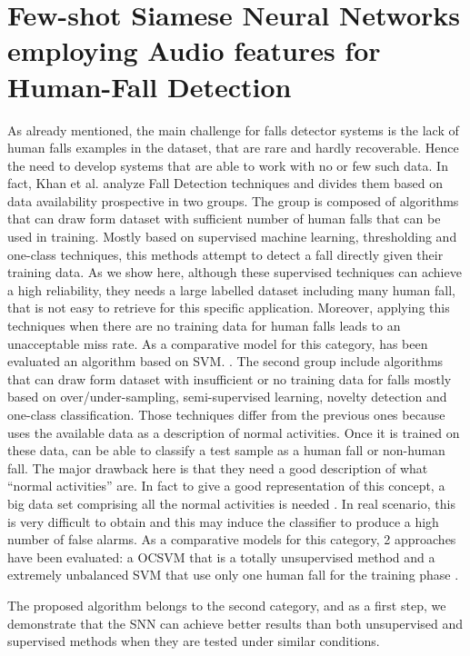 \section{Few-shot Siamese Neural Networks employing Audio features for Human-Fall Detection}
\label{sec:siamese_few_shot}
As already mentioned, the main challenge for falls detector systems is the lack of human falls examples in the dataset, that are rare and hardly recoverable. Hence the need to develop systems that are able to work with no or few such data. In fact, Khan et al. \cite{khan2017review} analyze Fall Detection techniques and divides them based on data availability prospective in two groups. The group is composed of algorithms that can draw form dataset with sufficient number of human falls that can be used in training. Mostly based on supervised machine learning, thresholding and one-class techniques, this methods attempt to detect a fall directly given their training data. As we show here, although these supervised techniques can achieve a high reliability, they needs a large labelled dataset including many human fall, that is not easy to retrieve for this specific application. Moreover, applying this techniques when there are no training data for human falls leads to an unacceptable miss rate. As a comparative model for this category, has been evaluated an algorithm based on SVM.%
. The second group include algorithms that can draw form dataset with insufficient or no training data for falls mostly based on over/under-sampling, semi-supervised learning, novelty detection and one-class classification. Those techniques differ from the previous ones because uses the available data as a description of normal activities. Once it is trained on these data, can be able to classify a test sample as a human fall or non-human fall. The major drawback here is that they need a good description of what ``normal activities'' are. In fact to give a good representation of this concept, a big data set comprising all the normal activities is needed \cite{pimentel2014review}. In real scenario, this is very difficult to obtain and this may induce the classifier to produce a high number of false alarms. As a comparative models for this category, 2 approaches have been evaluated: a OCSVM that is a totally unsupervised method and a extremely unbalanced SVM that use only one human fall for the training phase%
.

The proposed algorithm belongs to the second category, and as a first step, we demonstrate that the SNN can achieve better results than both unsupervised and supervised methods when they are tested under similar conditions.


